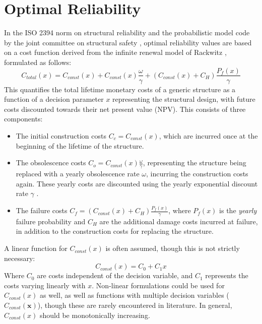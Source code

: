 \newpage
\section{Optimal Reliability}

In the ISO 2394 norm on structural reliability \citep{iso2394} and the probabilistic model code by the joint committee on structural safety \citep{JCSS2000ProbabilisticDesign}, optimal reliability values are based on a cost function derived from the infinite renewal model of Rackwitz \citep{Rackwitz2000OptimizationVerification}, formulated as follows:
\begin{equation}
    \label{eqn:C_total}
    C_{total}(x) = C_{const}(x) + C_{const}(x) \frac{\omega}{\gamma} + (C_{const}(x) + C_H) \frac{P_f(x)}{\gamma}
\end{equation}
This quantifies the total lifetime monetary costs of a generic structure as a function of a decision parameter $x$ representing the structural design, with future costs discounted towards their net present value (NPV).
This consists of three components:

\begin{itemize}
    \item The initial construction costs $C_c = C_{const}(x)$, which are incurred once at the beginning of the lifetime of the structure. 
    \item The obsolescence costs $C_o = C_{const}(x)\frac{\omega}{\gamma}$, representing the structure being replaced with a yearly obsolescence rate $\omega$, incurring the construction costs again.
    These yearly costs are discounted using the yearly exponential discount rate $\gamma$ \citep{Green1996ExponentialTime}.
    \item The failure costs $C_f = (C_{const}(x) + C_H) \frac{P_f(x)}{\gamma}$, where $P_f(x)$ is the \emph{yearly} failure probability and $C_H$ are the additional damage costs incurred at failure, in addition to the construction costs for replacing the structure.
\end{itemize}

A linear function for $C_{const}(x)$ is often assumed, though this is not strictly necessary:
\begin{equation}
    \label{eqn:C_const_linear}
    C_{const}(x) = C_0 + C_1 x
\end{equation}
Where $C_0$ are costs independent of the decision variable, and $C_1$ represents the costs varying linearly with $x$.
Non-linear formulations could be used for $C_{const}(x)$ as well, as well as functions with multiple decision variables ($C_{const}(\mathbf{x})$), though these are rarely encountered in literature.
In general, $C_{const}(x)$ should be monotonically increasing. %

